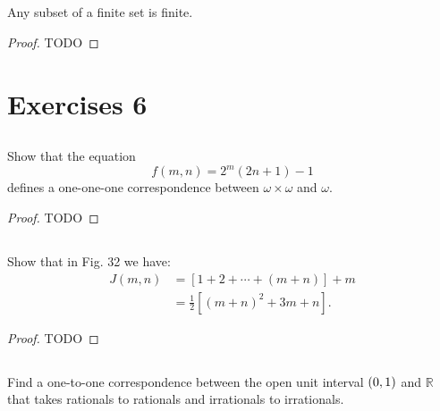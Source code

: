 \documentclass{report}
\begin{document}
\subsection{}%

  \begin{corollary}[6G]
    Any subset of a finite set is finite.
  \end{corollary}

  \begin{proof}
    TODO
  \end{proof}

\section{Exercises 6}%

\subsection{}%

  Show that the equation $$f(m, n) = 2^m(2n + 1) - 1$$ defines a one-one-one
    correspondence between $\omega \times \omega$ and $\omega$.

  \begin{proof}
    TODO
  \end{proof}

\subsection{}%

  Show that in Fig. 32 we have:
    \begin{align*}
      J(m, n)
        & = [1 + 2 + \cdots + (m + n)] + m \\
        & = \frac{1}{2}[(m + n)^2 + 3m + n].
    \end{align*}

  \begin{proof}
    TODO
  \end{proof}

\subsection{}%

  Find a one-to-one correspondence between the open unit interval $\left(0, 1\right)$
    and $\mathbb{R}$ that takes rationals to rationals and irrationals to
    irrationals.
\end{document}
